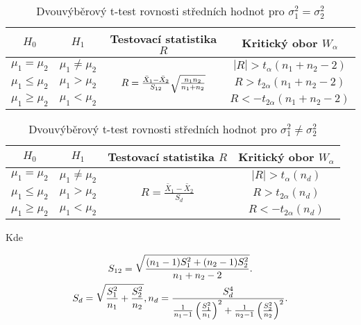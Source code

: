 \documentclass[thesis=B,czech]{FITthesis}[2012/06/26]
\begin{document}
\begin{table}[ht] \centering
\caption{Dvouvýběrový t-test rovnosti středních hodnot pro $\sigma^{2}_{1}=\sigma^{2}_{2}$ \cite[tab. 9.3.5]{VŠCHT}}
\label{tab:Dvouvýběrový t-testrovnosti středních hodnot pro shodné rozptyly}
\begin{tabular}{|c|c|c|c|}
\hline
 $H_{0}$ & $H_{1}$ & Testovací statistika $R$ & Kritický obor $W_{\alpha}$  \\ \hline
 $\mu_{1}=\mu_{2}$ & $\mu_{1}\neq\mu_{2}$ & 
 \multirow{3}{*}{$R=\frac{\bar{X}_{1}-\bar{X}_{2}}{S_{12}}\smash[b]{\sqrt{\frac{n_{1}n_{2}}{n_{1}+n_{2}}}}$}  & 
 $\left | R \right |> \mathit{t}_{\alpha}(n_{1}+n_{2}-2)$   \\
 $\mu_{1}\leq\mu_{2}$ & $\mu_{1}>\mu_{2}$ &  &  $R > \mathit{t}_{2\alpha}(n_{1}+n_{2}-2)$   \\
$\mu_{1}\geq\mu_{2}$ & $\mu_{1}<\mu_{2}$ &  & $R < - \mathit{t}_{2\alpha}(n_{1}+n_{2}-2)$ \\ \hline
\end{tabular}
\end{table}

\begin{table}[h] \centering
\caption{Dvouvýběrový t-test rovnosti středních hodnot pro $\sigma^{2}_{1}\neq\sigma^{2}_{2}$ \cite[tab. 9.3.6]{VŠCHT}}
\label{tab:Dvouvýběrový t-testrovnosti středních hodnot pro různé rozptyly}
\begin{tabular}{|c|c|c|c|}
\hline
 $H_{0}$ & $H_{1}$ & Testovací statistika $R$ & Kritický obor $W_{\alpha}$  \\ \hline
$\mu_{1}=\mu_{2}$ & $\mu_{1}\neq\mu_{2}$ & 
 \multirow{3}{*}{$R=\frac{\bar{X}_{1}-\bar{X}_{2}}{S_{d}}$}  & 
 $\left | R \right |> \mathit{t}_{\alpha}(n_{d})$   \\
 $\mu_{1}\leq\mu_{2}$ & $\mu_{1}>\mu_{2}$ &  &  $R > \mathit{t}_{2\alpha}(n_{d})$   \\
$\mu_{1}\geq\mu_{2}$ & $\mu_{1}<\mu_{2}$ &  & $R < - \mathit{t}_{2\alpha}(n_{d})$ \\ \hline
\end{tabular}
\end{table}

\noindent Kde


$$S_{12}=\sqrt{\smash[b]{\frac{(n_{1}-1)S^{2}_{1}+(n_{2}-1)S^{2}_{2}}{n_{1}+n_{2}-2}}}.$$

$$S_{d}=\sqrt{\smash[b]{\frac{S^{2}_{1}}{n_{1}}+\frac{S^{2}_{2}}{n_{2}}}}, 
n_{d}=\frac{S^{4}_{d}}{\frac{1}{n_{1}-1}\left ( \frac{S^{2}_{1}}{n_{1}} \right )^2+
\frac{1}{n_{2}-1}\left ( \frac{S^{2}_{2}}{n_{2}} \right )^2}.$$
\end{document}
